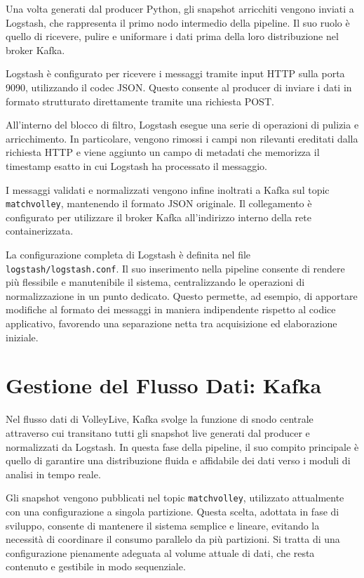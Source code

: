 \documentclass[a4paper,12pt]{report}
\begin{document}
Una volta generati dal producer Python, gli snapshot arricchiti vengono inviati a Logstash, che rappresenta il primo nodo intermedio della pipeline. Il suo ruolo è quello di ricevere, pulire e uniformare i dati prima della loro distribuzione nel broker Kafka.

Logstash è configurato per ricevere i messaggi tramite input HTTP sulla porta 9090, utilizzando il codec JSON. Questo consente al producer di inviare i dati in formato strutturato direttamente tramite una richiesta POST. 

All’interno del blocco di filtro, Logstash esegue una serie di operazioni di pulizia e arricchimento. In particolare, vengono rimossi i campi non rilevanti ereditati dalla richiesta HTTP e viene aggiunto un campo di metadati che memorizza il timestamp esatto in cui Logstash ha processato il messaggio.

I messaggi validati e normalizzati vengono infine inoltrati a Kafka sul topic \texttt{matchvolley}, mantenendo il formato JSON originale. Il collegamento è configurato per utilizzare il broker Kafka all’indirizzo interno della rete containerizzata.

La configurazione completa di Logstash è definita nel file 	\texttt{logstash/logstash.conf}. Il suo inserimento nella pipeline consente di rendere più flessibile e manutenibile il sistema, centralizzando le operazioni di normalizzazione in un punto dedicato. Questo permette, ad esempio, di apportare modifiche al formato dei messaggi in maniera indipendente rispetto al codice applicativo, favorendo una separazione netta tra acquisizione ed elaborazione iniziale.

\section{Gestione del Flusso Dati: Kafka}

Nel flusso dati di VolleyLive, Kafka svolge la funzione di snodo centrale attraverso cui transitano tutti gli snapshot live generati dal producer e normalizzati da Logstash. In questa fase della pipeline, il suo compito principale è quello di garantire una distribuzione fluida e affidabile dei dati verso i moduli di analisi in tempo reale.

Gli snapshot vengono pubblicati nel topic \texttt{matchvolley}, utilizzato attualmente con una configurazione a singola partizione. Questa scelta, adottata in fase di sviluppo, consente di mantenere il sistema semplice e lineare, evitando la necessità di coordinare il consumo parallelo da più partizioni. Si tratta di una configurazione pienamente adeguata al volume attuale di dati, che resta contenuto e gestibile in modo sequenziale.
\end{document}
